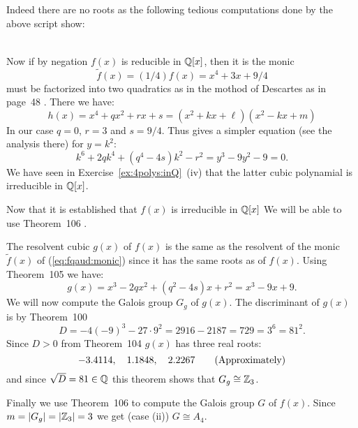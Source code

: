 \begin{myenumerate}
Indeed there are no roots as the following tedious computations
done by the above script show:

{\small
\begin{eqnarray*}

\end{eqnarray*}
}

Now if by negation \(f(x)\) is reducible in \(\mathbb{Q}[x]\),
then it is the monic
\begin{equation}  \label{eq:fqaud:monic}
\tilde{f}(x) = (1/4)f(x) = x^4 + 3x + 9/4
\end{equation}
must be factorized into two quadratics as in the mothod
of Descartes as in page~48 \cite{Rotman98}. There we have:
\begin{equation*}
 h(x) = x^4 + qx^2 + rx + s = (x^2 + kx + \ell)(x^2 - kx + m)
\end{equation*}
In our case \(q = 0\), \(r = 3\) and \(s = 9/4\).
Thus gives a simpler equation (see the analysis there)
for \(y = k^2\):
\begin{equation*}
k^6 + 2qk^4 + (q^4 - 4s)k^2 - r^2 =
y^3 - 9y^2 - 9 = 0.
\end{equation*}
We have seen in Exercise~\ref{ex:4polys:inQ}~(iv) that
the latter cubic polynamial is irreducible in \(\mathbb{Q}[x]\).

Now that it is established that \(f(x)\) is irreducible in \(\mathbb{Q}[x]\)
We will be able to use Theorem~106 \cite{Rotman98}.

The resolvent cubic \(g(x)\) of \(f(x)\) is
the same as the resolvent of
the monic \(\tilde{f}(x)\) of (\ref{eq:fqaud:monic})
since it has the same roots as of \(f(x)\). Using
Theorem~105 \cite{Rotman98} we have:
\begin{equation*}
g(x) = x^3 - 2qx^2 + (q^2 - 4s)x + r^2 = x^3 - 9x + 9.
\end{equation*}
We will now compute the Galois group \(G_g\) of \(g(x)\).
The discriminant of \(g(x)\) is by Theorem~100 \cite{Rotman98}
\begin{equation*}
D = -4(-9)^3 - 27\cdot9^2 = 2916 - 2187 = 729 = 3^6 = 81^2.
\end{equation*}
Since \(D>0\) from Theorem~104
\(g(x)\) has three real roots:
\begin{equation*}
-3.4114,\quad 1.1848,\quad 2.2267\qquad \textnormal{(Approximately)}
\end{equation*}
and
since \(\sqrt{D} = 81 \in \mathbb{Q}\) this theorem shows that \(G_g \cong \mathbb{Z}_3\).

Finally we use Theorem~106 \cite{Rotman98} to compute
the Galois group $G$ of \(f(x)\).
Since \(m = |G_g| = |\mathbb{Z}_3| = 3\)
we get (case (ii)) \(G \cong A_4\).



\end{myenumerate}
